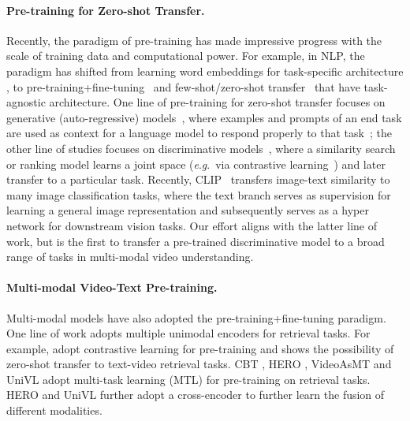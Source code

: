 \documentclass[11pt]{article}
\newcommand{\eg}{\textit{e}.\textit{g}.}
\begin{document}
\paragraph{Pre-training for Zero-shot Transfer.}
Recently, the paradigm of pre-training has made impressive progress with the scale of training data and computational power. 
For example, in NLP, the paradigm has shifted from learning word embeddings for task-specific architecture \cite{mikolov2013distributed,bojanowski2017enriching,peters2018deep}, to pre-training+fine-tuning~\cite{devlin-etal-2019-bert,liu2019roberta,lewis-etal-2020-bart} and few-shot/zero-shot transfer~\cite{radford2018improving,radford2019language,brown2020language,alayrac2020self,ramesh2021zero}
that have task-agnostic architecture.
One line of pre-training for zero-shot transfer focuses on generative (auto-regressive) models~\cite{radford2018improving,radford2019language,brown2020language}, where examples and prompts of an end task are used as context for a language model to respond properly to that task~\cite{brown2020language}; the other line of studies focuses on discriminative models~\cite{alayrac2020self,miech2020end}, where a   similarity search or ranking model learns a joint space (\eg ~via contrastive learning~\cite{chen2020simple,he2020momentum}) and later transfer to a particular task.
Recently, CLIP~\cite{radford2021learning} transfers image-text similarity to many image classification tasks, where the text branch serves as supervision for learning a general image representation and subsequently serves as a hyper network for downstream vision tasks.
Our effort aligns with the latter line of work, but is the first to  transfer a pre-trained discriminative model to a broad range of tasks in multi-modal video understanding.













\paragraph{Multi-modal Video-Text Pre-training.}
Multi-modal models have also adopted the pre-training+fine-tuning paradigm.
One line of work 
adopts multiple unimodal encoders for retrieval tasks.
For example, \cite{miech2019howto100m,miech2020end,ging2020coot,gabeur2020multi,alayrac2020self,patrick2021supportset,huang21naacl} adopt contrastive learning for pre-training and shows the possibility of zero-shot transfer to text-video retrieval tasks.
CBT \cite{sun2019contrastive}, HERO \cite{li-etal-2020-hero}, VideoAsMT \cite{korbar2020video} and UniVL \cite{luo2020univilm} adopt multi-task learning (MTL) for pre-training on retrieval tasks.
HERO \cite{li-etal-2020-hero} and UniVL \cite{luo2020univilm} further adopt a cross-encoder to further learn the fusion of different modalities.
\end{document}
